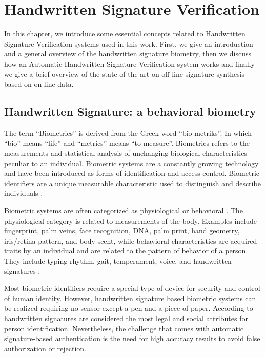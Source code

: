 
\chapter{Handwritten Signature Verification} \label{ch:bg}
In this chapter, we introduce some essential concepts related to Handwritten Signature Verification systems used in this work. First, we give an introduction and a general overview of the handwritten signature biometry, then we discuss how an Automatic Handwritten Signature Verification system works and finally we give a brief overview of the state-of-the-art on off-line signature synthesis based on on-line data.

\section{Handwritten Signature: a behavioral biometry}

The term ``Biometrics'' is derived from the Greek word ``bio-metriks''. In which ``bio'' means ``life'' and ``metrics'' means ``to measure''. Biometrics refers to the measurements and statistical analysis of unchanging biological characteristics peculiar to an individual. Biometric systems are
a constantly growing technology \cite{jain2004biometrics} and have been introduced as forms of identification and access control. Biometric identifiers are a unique measurable characteristic used to distinguish and describe individuals \cite{jain2000biometric}. 

Biometric systems are often categorized as physiological or behavioral \cite{ross2008introduction}. The physiological category is related to measurements of the body. Examples include fingerprint, palm veins, face recognition, DNA, palm print, hand geometry, iris/retina pattern, and body scent, while behavioral characteristics are acquired traits by an individual and are related to the pattern of behavior of a person. They include typing rhythm, gait, temperament, voice, and handwritten signatures \cite{jain2016}.

Most biometric identifiers require a special type of device for security and control of human identity. However, handwritten signature based biometric systems can be realized requiring no sensor except a pen and a piece of paper. According to \cite{uppalapati2007integration} handwritten signatures are considered the most legal and social attributes for person identification. Nevertheless, the challenge that comes with automatic signature-based authentication is the need for high accuracy results to avoid false authorization or rejection.

